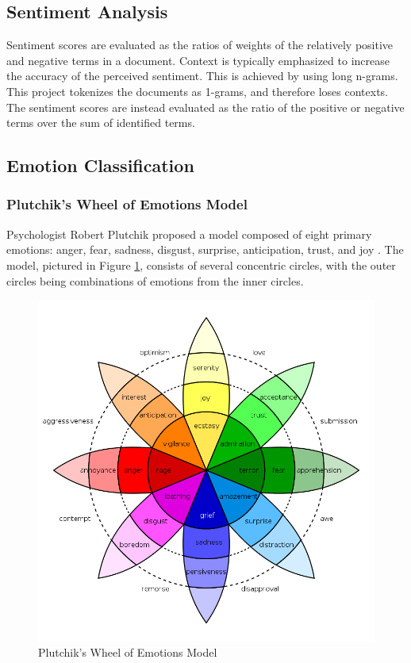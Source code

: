 \documentclass[11pt]{article}
\begin{document}
\subsection{Sentiment Analysis}

Sentiment scores are evaluated as the ratios of weights of the relatively positive and negative terms in a document. Context is typically emphasized to increase the accuracy of the perceived sentiment. This is achieved by using long n-grams. This project tokenizes the documents as 1-grams, and therefore loses contexts. The sentiment scores are instead evaluated as the ratio of the positive or negative terms over the sum of identified terms.

\subsection{Emotion Classification}

\subsubsection{Plutchik's Wheel of Emotions Model}

Psychologist Robert Plutchik proposed a model composed of eight primary emotions: anger, fear, sadness, disgust, surprise, anticipation, trust, and joy \cite{wheel}. The model, pictured in Figure \ref{fig:wheel}, consists of several concentric circles, with the outer circles being combinations of emotions from the inner circles.

\begin{figure}[!ht]
  \includegraphics[scale=0.4]{../statics/wheel.png}
  \centering
  \caption{Plutchik's Wheel of Emotions Model}
  \label{fig:wheel}
\end{figure}
\end{document}
